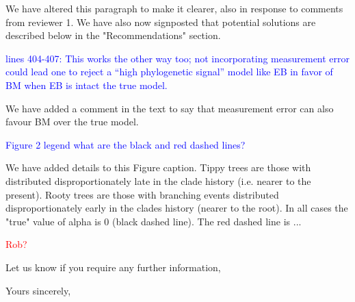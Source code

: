\documentclass[12pt]{letter}
\begin{document}
\begin{letter}{}
We have altered this paragraph to make it clearer, also in response to comments from reviewer 1. We have also now signposted that potential solutions are described below in the "Recommendations" section.

\textcolor{blue}{lines 404-407: This works the other way too; not incorporating measurement error could lead one to reject a “high phylogenetic signal” model like EB in favor of BM when EB is intact the true model.}

We have added a comment in the text to say that measurement error can also favour BM over the true model.

\textcolor{blue}{Figure 2 legend what are the black and red dashed lines?}

We have added details to this Figure caption. Tippy trees are those with distributed disproportionately late in the clade history (i.e. nearer to the present). Rooty trees are those with branching events distributed disproportionately early in the clades history (nearer to the root). In all cases the "true" value of alpha is 0 (black dashed line). The red dashed line is ... %

\textcolor{red}{Rob?}

Let us know if you require any further information,

\closing{Yours sincerely,}

\end{letter}
\end{document}

